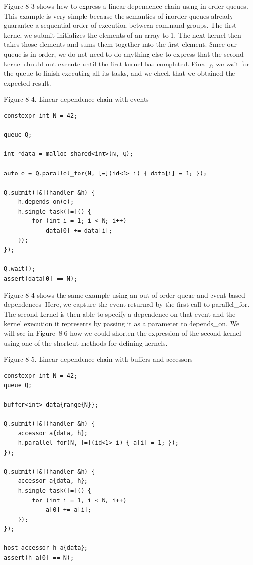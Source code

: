 Figure 8-3 shows how to express a linear dependence chain using in-order queues. This example is very simple because the semantics of inorder queues already guarantee a sequential order of execution between command groups. The first kernel we submit initializes the elements of an array to 1. The next kernel then takes those elements and sums them together into the first element. Since our queue is in order, we do not need to do anything else to express that the second kernel should not execute until the first kernel has completed. Finally, we wait for the queue to finish executing all its tasks, and we check that we obtained the expected result.\par

\hspace*{\fill} \par %
Figure 8-4. Linear dependence chain with events
\begin{lstlisting}[caption={}]
constexpr int N = 42;

queue Q;

int *data = malloc_shared<int>(N, Q);

auto e = Q.parallel_for(N, [=](id<1> i) { data[i] = 1; });

Q.submit([&](handler &h) {
	h.depends_on(e);
	h.single_task([=]() {
		for (int i = 1; i < N; i++)
			data[0] += data[i];
	});
});

Q.wait();
assert(data[0] == N);
\end{lstlisting}

Figure 8-4 shows the same example using an out-of-order queue and event-based dependences. Here, we capture the event returned by the first call to parallel\_for. The second kernel is then able to specify a dependence on that event and the kernel execution it represents by passing it as a parameter to depends\_on. We will see in Figure 8-6 how we could shorten the expression of the second kernel using one of the shortcut methods for defining kernels.\par

\hspace*{\fill} \par %
Figure 8-5. Linear dependence chain with buffers and accessors
\begin{lstlisting}[caption={}]
constexpr int N = 42;
queue Q;

buffer<int> data{range{N}};

Q.submit([&](handler &h) {
	accessor a{data, h};
	h.parallel_for(N, [=](id<1> i) { a[i] = 1; });
});

Q.submit([&](handler &h) {
	accessor a{data, h};
	h.single_task([=]() {
		for (int i = 1; i < N; i++)
			a[0] += a[i];
	});
});

host_accessor h_a{data};
assert(h_a[0] == N);
\end{lstlisting}

